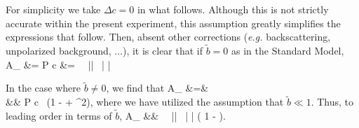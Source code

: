 For simplicity we take $\Delta c = 0$ in what follows.  Although this is not strictly accurate within the present experiment, this assumption greatly simplifies the expressions that follow.  Then, absent other corrections (\emph{e.g.} backscattering, unpolarized background, ...), it is clear that if $\tilde{b} = 0$ as in the Standard Model, %
\bea
A_{} &=\;\;  P c &=\;\; \Abeta \,  \, || \, \langle | \cos\theta | \rangle
\eea

In the case where $\tilde{b} \neq 0$, we find that 
\bea
A_{} &=&  \\
&\approx&   P c \, (1 -  + {}^2),
\eea
where we have utilized the assumption that $\tilde{b} \ll 1$.
Thus, to leading order in terms of $\tilde{b}$, 
\bea
A_{} &\approx& \Abeta \,  \, || \, \langle | \cos\theta | \rangle \left( 1 - \bFierz {} \right).
\eea



